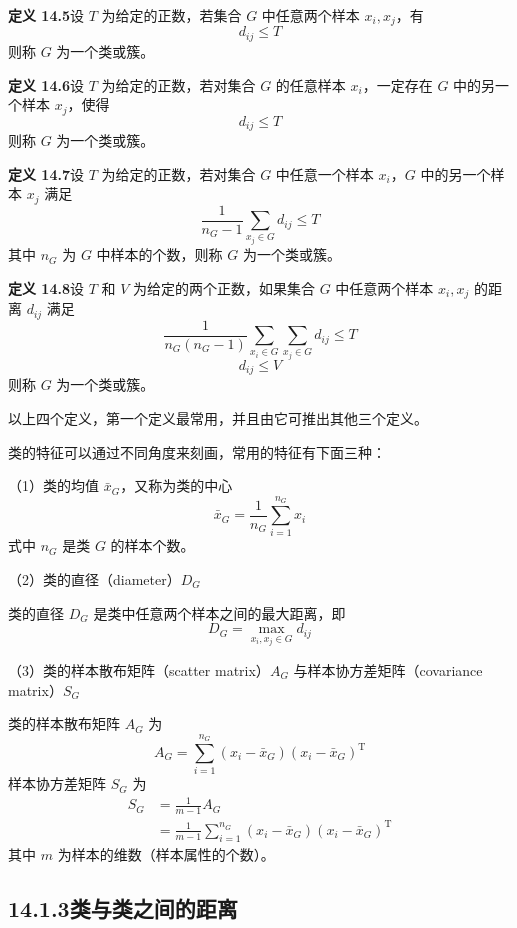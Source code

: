 \documentclass[UTF8,12pt,a4paper,fontset=fandol]{ctexart}
\begin{document}
\noindent\textbf{定义 14.5}\quad 设 $T$ 为给定的正数，若集合 $G$ 中任意两个样本 $x_i,x_j$，有
\[
d_{ij}\leqslant T
\]
则称 $G$ 为一个类或簇。

\noindent\textbf{定义 14.6}\quad 设 $T$ 为给定的正数，若对集合 $G$ 的任意样本 $x_i$，一定存在 $G$ 中的另一个样本 $x_j$，使得
\[
d_{ij}\leqslant T
\]
则称 $G$ 为一个类或簇。

\noindent\textbf{定义 14.7}\quad 设 $T$ 为给定的正数，若对集合 $G$ 中任意一个样本 $x_i$，$G$ 中的另一个样本 $x_j$ 满足
\[
\frac{1}{n_G-1}\sum_{x_j\in G} d_{ij}\leqslant T
\]
其中 $n_G$ 为 $G$ 中样本的个数，则称 $G$ 为一个类或簇。

\noindent\textbf{定义 14.8}\quad 设 $T$ 和 $V$ 为给定的两个正数，如果集合 $G$ 中任意两个样本 $x_i,x_j$ 的距离 $d_{ij}$ 满足
\[
\frac{1}{n_G(n_G-1)}\sum_{x_i\in G}\sum_{x_j\in G} d_{ij}\leqslant T
\]
\[
d_{ij}\leqslant V
\]
则称 $G$ 为一个类或簇。

以上四个定义，第一个定义最常用，并且由它可推出其他三个定义。

类的特征可以通过不同角度来刻画，常用的特征有下面三种：

（1）类的均值 $\bar x_G$，又称为类的中心
\begin{equation}
\bar x_G=\frac{1}{n_G}\sum_{i=1}^{n_G}x_i
\tag{14.10}
\end{equation}
式中 $n_G$ 是类 $G$ 的样本个数。

（2）类的直径（diameter）$D_G$

类的直径 $D_G$ 是类中任意两个样本之间的最大距离，即
\begin{equation}
D_G=\max_{x_i,x_j\in G} d_{ij}
\tag{14.11}
\end{equation}

（3）类的样本散布矩阵（scatter matrix）$A_G$ 与样本协方差矩阵（covariance matrix）$S_G$

类的样本散布矩阵 $A_G$ 为
\begin{equation}
A_G=\sum_{i=1}^{n_G}(x_i-\bar x_G)(x_i-\bar x_G)^{\mathrm{T}}
\tag{14.12}
\end{equation}
样本协方差矩阵 $S_G$ 为
\begin{equation}
\begin{aligned}
S_G&=\frac{1}{m-1}A_G\\
&=\frac{1}{m-1}\sum_{i=1}^{n_G}(x_i-\bar x_G)(x_i-\bar x_G)^{\mathrm{T}}
\end{aligned}
\tag{14.13}
\end{equation}
其中 $m$ 为样本的维数（样本属性的个数）。

\subsection*{14.1.3\quad 类与类之间的距离}
\end{document}
